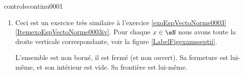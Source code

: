 \begin{corrige}{controlecontinu0001}
\begin{enumerate}
    \item
        Ceci est un exercice très similaire à l'exercice \ref{exoEspVectoNorme0003}\ref{ItemexoEspVectoNorme0003iv}. Pour chaque \( x\in\eN\) nous avons toute la droite verticale correspondante, voir la figure \ref{LabelFigexamsseptii}.
        \newcommand{\CaptionFigexamsseptii}{Pour l'exerice \ref{exocontrolecontinu0001}.}

        L'ensemble est non borné, il est fermé (et non ouvert). Sa fermeture est lui-même, et son intérieur est vide. Sa frontière est lui-même.

        

\end{enumerate}


\end{corrige}
